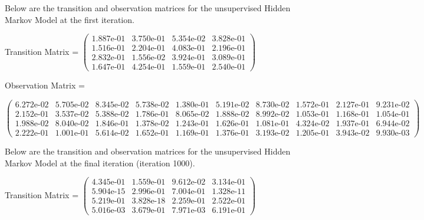 Below are the transition and observation matrices for the unsupervised Hidden Markov Model at the first iteration.

Transition Matrix = \small $\begin{pmatrix}
1.887\text{e-}01 & 3.750\text{e-}01 & 5.354\text{e-}02 & 3.828\text{e-}01\\
1.516\text{e-}01 & 2.204\text{e-}01 & 4.083\text{e-}01 & 2.196\text{e-}01\\
2.832\text{e-}01 & 1.556\text{e-}02 & 3.924\text{e-}01 & 3.089\text{e-}01\\
1.647\text{e-}01 & 4.254\text{e-}01 & 1.559\text{e-}01 & 2.540\text{e-}01   
\end{pmatrix}$
\normalsize

Observation Matrix =

\small
$\begin{pmatrix}
6.272\text{e-}02 & 5.705\text{e-}02 & 8.345\text{e-}02 & 5.738\text{e-}02 & 1.380\text{e-}01 & 5.191\text{e-}02 & 8.730\text{e-}02 & 1.572\text{e-}01 & 2.127\text{e-}01 & 9.231\text{e-}02\\
2.152\text{e-}01 & 3.537\text{e-}02 & 5.388\text{e-}02 & 1.786\text{e-}01 & 8.065\text{e-}02 & 1.888\text{e-}02 & 8.992\text{e-}02 & 1.053\text{e-}01 & 1.168\text{e-}01 & 1.054\text{e-}01\\
1.988\text{e-}02 & 8.040\text{e-}02 & 1.846\text{e-}01 & 1.378\text{e-}02 & 1.243\text{e-}01 & 1.626\text{e-}01 & 1.081\text{e-}01 & 4.324\text{e-}02 & 1.937\text{e-}01 & 6.944\text{e-}02\\
2.222\text{e-}01 & 1.001\text{e-}01 & 5.614\text{e-}02 & 1.652\text{e-}01 & 1.169\text{e-}01 & 1.376\text{e-}01 & 3.193\text{e-}02 & 1.205\text{e-}01 & 3.943\text{e-}02 & 9.930\text{e-}03 
\end{pmatrix}$
\normalsize
\medskip

Below are the transition and observation matrices for the unsupervised Hidden Markov Model at the final iteration (iteration 1000).

Transition Matrix = \small $\begin{pmatrix}
    4.345\text{e-}01 & 1.559\text{e-}01 & 9.612\text{e-}02 & 3.134\text{e-}01\\
    5.904\text{e-}15 & 2.996\text{e-}01 & 7.004\text{e-}01 & 1.328\text{e-}11\\
    5.219\text{e-}01 & 3.828\text{e-}18 & 2.259\text{e-}01 & 2.522\text{e-}01\\
    5.016\text{e-}03 & 3.679\text{e-}01 & 7.971\text{e-}03 & 6.191\text{e-}01 
\end{pmatrix}$ 
\normalsize

